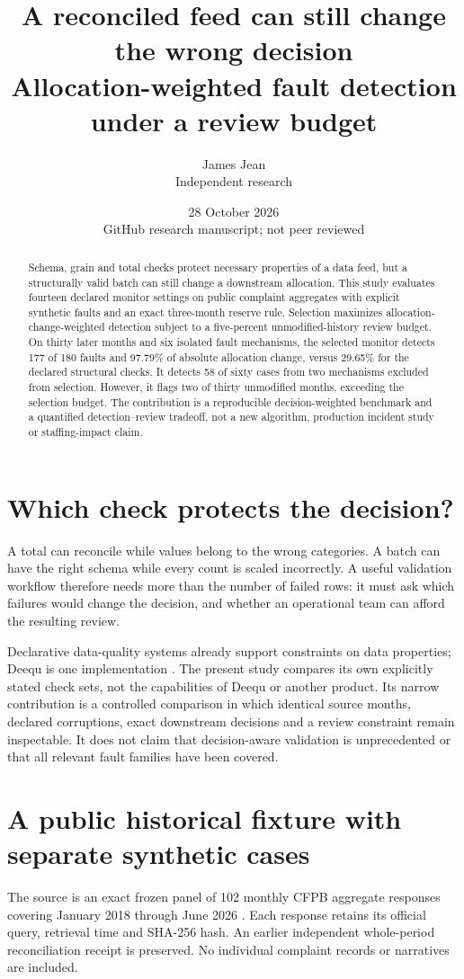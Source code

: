 \documentclass[11pt]{article}
\title{A reconciled feed can still change the wrong decision\\\large Allocation-weighted fault detection under a review budget}
\author{James Jean\\Independent research}
\date{28 October 2026\\GitHub research manuscript; not peer reviewed}
\begin{document}
\maketitle
\begin{abstract}
Schema, grain and total checks protect necessary properties of a data feed, but a structurally valid batch can still change a downstream allocation. This study evaluates fourteen declared monitor settings on public complaint aggregates with explicit synthetic faults and an exact three-month reserve rule. Selection maximizes allocation-change-weighted detection subject to a five-percent unmodified-history review budget. On thirty later months and six isolated fault mechanisms, the selected monitor detects 177 of 180 faults and 97.79\% of absolute allocation change, versus 29.65\% for the declared structural checks. It detects 58 of sixty cases from two mechanisms excluded from selection. However, it flags two of thirty unmodified months, exceeding the selection budget. The contribution is a reproducible decision-weighted benchmark and a quantified detection--review tradeoff, not a new algorithm, production incident study or staffing-impact claim.
\end{abstract}
\section{Which check protects the decision?}
A total can reconcile while values belong to the wrong categories. A batch can have the right schema while every count is scaled incorrectly. A useful validation workflow therefore needs more than the number of failed rows: it must ask which failures would change the decision, and whether an operational team can afford the resulting review.

Declarative data-quality systems already support constraints on data properties; Deequ is one implementation \cite{deequ}. The present study compares its own explicitly stated check sets, not the capabilities of Deequ or another product. Its narrow contribution is a controlled comparison in which identical source months, declared corruptions, exact downstream decisions and a review constraint remain inspectable. It does not claim that decision-aware validation is unprecedented or that all relevant fault families have been covered.

\section{A public historical fixture with separate synthetic cases}
The source is an exact frozen panel of 102 monthly CFPB aggregate responses covering January 2018 through June 2026 \cite{cfpb}. Each response retains its official query, retrieval time and SHA-256 hash. An earlier independent whole-period reconciliation receipt is preserved. No individual complaint records or narratives are included.
\end{document}
